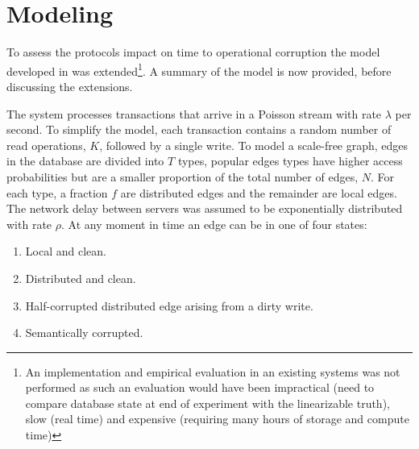 \section{Modeling}
\label{sec:modeling}

To assess the protocols impact on time to operational corruption the model developed in \cite{Ezhilchelvan2018} was extended\footnote{An implementation and empirical evaluation in an existing systems was not performed as such an evaluation would have been impractical (need to compare database state at end of experiment with the linearizable truth), slow (real time) and expensive (requiring many hours of storage and compute time)}. A summary of the model is now provided, before discussing the extensions.

The system processes transactions that arrive in a Poisson stream with rate $\lambda$ per second. To simplify the model, each transaction contains a random number of read operations, $K$, followed by a single write. To model a scale-free graph, edges in the database are divided into $T$ types, popular edges types have higher access probabilities but are a smaller proportion of the total number of edges, $N$. For each type, a fraction $f$ are distributed edges and the remainder are local edges. The network delay between servers was assumed to be exponentially distributed with rate $\rho$. At any moment in time an edge can be in one of four states:
\begin{enumerate}
\item Local and clean.
\item Distributed and clean.
\item Half-corrupted distributed edge arising from a dirty write.
\item Semantically corrupted.
\end{enumerate}


